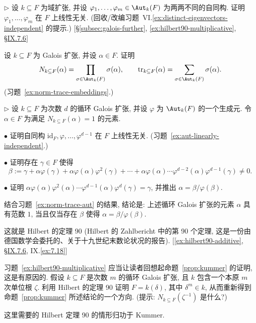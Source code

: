 \begin{prob}\label{ex:aut-linearly-independent}
$\triangleright$ 设 $k\subseteq F$ 为域扩张, 并设 $\varphi_1,\ldots,\varphi_m\in\Aut_k(F)$ 为两两不同的自同构. 证明 $\varphi_1,\ldots,\varphi_m$ 在 $F$ 上线性无关. (回收/改编习题~VI.\ref{ex:distinct-eigenvectors-independent} 的提示.) [§\ref{subsec:galois-further}, \ref{ex:hilbert90-multiplicative}, §\hyperref[subsec:7.6-group-cohomology]{IX.7.6}]
\end{prob}

\begin{prob}\label{ex:norm-trace-product}
设 $k\subseteq F$ 为 Galois 扩张, 并设 $\alpha\in F$. 证明
\[
N_{k\subseteq F}(\alpha)=\prod_{\sigma\in\Aut_k(F)}\sigma(\alpha),\qquad \tr_{k\subseteq F}(\alpha)=\sum_{\sigma\in\Aut_k(F)}\sigma(\alpha).
\]
(习题~\ref{ex:norm-trace-embeddings}.)
\end{prob}

\begin{prob}\label{ex:hilbert90-multiplicative}
$\triangleright$ 设 $k\subseteq F$ 为次数 $d$ 的循环 Galois 扩张, 并设 $\varphi$ 为 $\Aut_k(F)$ 的一个生成元. 令 $\alpha\in F$ 为满足 $N_{k\subseteq F}(\alpha)=1$ 的元素.

$\bullet$ 证明自同构 $\mathrm{id}_F,\varphi,\ldots,\varphi^{d-1}$ 在 $F$ 上线性无关. (习题~\ref{ex:aut-linearly-independent}.)

$\bullet$ 证明存在 $\gamma\in F$ 使得
\[
\beta:=\gamma+\alpha\varphi(\gamma)+\alpha\varphi(\alpha)\varphi^2(\gamma)+\cdots+\alpha\varphi(\alpha)\cdots\varphi^{d-2}(\alpha)\varphi^{d-1}(\gamma)\neq 0.
\]

$\bullet$ 证明 $\alpha\varphi(\alpha)\varphi^2(\alpha)\cdots\varphi^{d-1}(\alpha)\varphi^d(\gamma)=\gamma$, 并推出 $\alpha=\beta/\varphi(\beta)$.

结合习题~\ref{ex:norm-trace-aut} 的结果, 结论是: 上述循环 Galois 扩张的元素 $\alpha$ 具有范数 $1$, 当且仅当存在 $\beta$ 使得 $\alpha=\beta/\varphi(\beta)$.

这就是 Hilbert 的定理 90 (Hilbert 的 Zahlbericht 中的第 90 个定理, 这是一份由德国数学会委托的、关于十九世纪末数论状况的报告). [\ref{ex:hilbert90-additive}, §\hyperref[subsec:7.6-group-cohomology]{IX.7.6}, IX.\ref{ex:7.18}]
\end{prob}

\begin{prob}\label{ex:hilbert90-kummer}
习题~\ref{ex:hilbert90-multiplicative} 应当让读者回想起命题~\ref{prop:kummer} 的证明, 这是有原因的. 假设 $k\subseteq F$ 是次数 $m$ 的循环 Galois 扩张, 且 $k$ 包含一个本原 $m$ 次单位根 $\zeta$. 利用 Hilbert 的定理 90 证明 $F=k(\delta)$, 其中 $\delta^m\in k$, 从而重新得到命题~\ref{prop:kummer} 所述结论的一个方向. (提示: $N_{k\subseteq F}(\zeta^{-1})$ 是什么?)

这里需要的 Hilbert 定理 90 的情形归功于 Kummer.
\end{prob}

